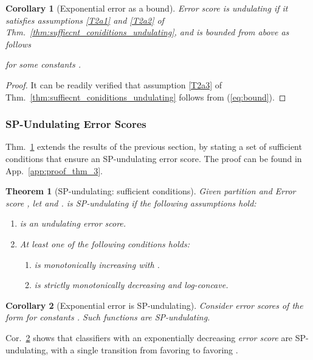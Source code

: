 \documentclass{article}
\newcommand{\app}{App.}
\newtheorem{theorem}{Theorem}
\newtheorem{corollary}{Corollary}
\begin{document}
\begin{corollary}[Exponential error as a bound]
\label{cor:exp_undulating}
\emph{Error score}  is undulating if it satisfies assumptions \ref{T2a1} and \ref{T2a2} of Thm.~\ref{thm:suffiecnt_coniditions_undulating}, and is bounded from above as follows

for some constants .
\end{corollary}
\begin{proof}
It can be readily verified that assumption \ref{T2a3} of Thm.~\ref{thm:suffiecnt_coniditions_undulating} follows from (\ref{eq:bound}).
\end{proof}


\subsubsection{SP-Undulating Error Scores}
\label{sec:SP_undulating}
Thm.~\ref{thm:suffiecnt_coniditions_sp_undulating} extends the results of the previous section, by stating a set of sufficient conditions that ensure an SP-undulating error score.
The proof can be found in \app~\ref{app:proof_thm_3}.

\begin{theorem}[SP-undulating: sufficient conditions]
\label{thm:suffiecnt_coniditions_sp_undulating}
Given partition  and Error score , let  and .   is SP-undulating if the following assumptions hold:
\begin{enumerate}\item  is an undulating \emph{error score}.
\item At least one of the following conditions holds:
\begin{enumerate}
\item  is
monotonically increasing with .
\item  is strictly monotonically decreasing and log-concave. 
\end{enumerate}

\end{enumerate}
\end{theorem}

\begin{corollary}[Exponential error is SP-undulating]
\label{cor:exp}
Consider \emph{error scores} of the form 
for constants . Such functions are SP-undulating. 
\end{corollary}
Cor.~\ref{cor:exp} shows that classifiers with an exponentially decreasing \emph{error score} are SP-undulating, with a single transition from favoring  to favoring .
\end{document}
